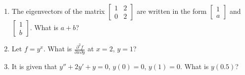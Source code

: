 \documentclass[journal,12pt,onecolumn]{IEEEtran}
\begin{document}
\begin{enumerate}
    \item The eigenvectors of the matrix $\begin{bmatrix}
                  1 & 2 \\
                  0 & 2
              \end{bmatrix}$ are written in the form $\begin{bmatrix}
                  1 \\
                  a
              \end{bmatrix}$ and $\begin{bmatrix}
                  1 \\b
              \end{bmatrix}$. What is $a+b$?

          \begin{enumerate}
          \end{enumerate}

    \item Let $f = y^x$. What is $\frac{\partial^2 f}{\partial{x}\partial{y}}$ at $x=2$, $y=1$?\\

          \begin{enumerate}
          \end{enumerate}

    \item It is given that $y'' + 2y' + y=0$, $y(0)=0$, $y(1)=0$. What is $y(0.5)$?\\

          \begin{enumerate}
          \end{enumerate}


\end{enumerate}
\end{document}
